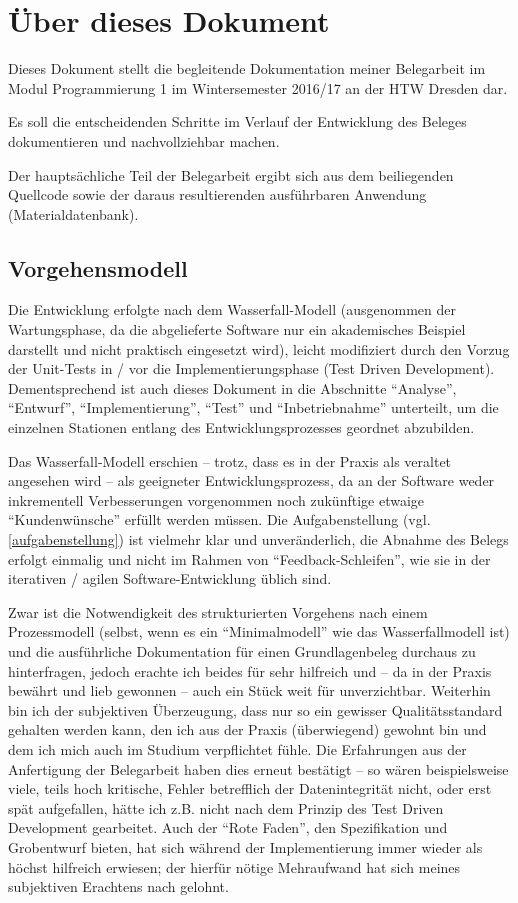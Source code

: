 \section{Über dieses Dokument}

Dieses Dokument stellt die begleitende Dokumentation meiner Belegarbeit im Modul Programmierung 1
im Wintersemester 2016/17 an der HTW Dresden dar.

Es soll die entscheidenden Schritte im Verlauf der Entwicklung des Beleges dokumentieren und
nachvollziehbar machen.

Der hauptsächliche Teil der Belegarbeit ergibt sich aus dem beiliegenden Quellcode sowie der daraus resultierenden
ausführbaren Anwendung (Materialdatenbank).

\subsection{Vorgehensmodell}
Die Entwicklung erfolgte nach dem Wasserfall-Modell (ausgenommen der Wartungsphase, da die abgelieferte Software
nur ein akademisches Beispiel darstellt und nicht praktisch eingesetzt wird), leicht modifiziert durch den Vorzug der
Unit-Tests in / vor die Implementierungsphase (Test Driven Development). Dementsprechend ist auch dieses Dokument
in die Abschnitte ``Analyse'', ``Entwurf'', ``Implementierung'', ``Test'' und ``Inbetriebnahme''
unterteilt, um die einzelnen Stationen entlang des Entwicklungsprozesses geordnet abzubilden.

Das Wasserfall-Modell erschien -- trotz, dass es in der Praxis als veraltet angesehen wird -- als geeigneter
Entwicklungsprozess, da an der Software weder inkrementell Verbesserungen vorgenommen noch zukünftige etwaige
``Kundenwünsche'' erfüllt werden müssen. Die Aufgabenstellung (vgl. \ref{aufgabenstellung}) ist vielmehr klar und
unveränderlich, die Abnahme des Belegs erfolgt einmalig und nicht im Rahmen von ``Feedback-Schleifen'', wie sie in
der iterativen / agilen Software-Entwicklung üblich sind.

Zwar ist die Notwendigkeit des strukturierten Vorgehens nach einem Prozessmodell (selbst, wenn es ein ``Minimalmodell''
wie das Wasserfallmodell ist) und die ausführliche Dokumentation für einen Grundlagenbeleg durchaus zu hinterfragen,
jedoch erachte ich beides für sehr hilfreich und -- da in der Praxis bewährt und lieb gewonnen -- auch ein Stück weit für
unverzichtbar. Weiterhin bin ich der subjektiven Überzeugung, dass nur so ein gewisser Qualitätsstandard gehalten werden
kann, den ich aus der Praxis (überwiegend) gewohnt bin und dem ich mich auch im Studium verpflichtet fühle.
Die Erfahrungen aus der Anfertigung der Belegarbeit haben dies erneut bestätigt -- so wären beispielsweise viele, teils
hoch kritische, Fehler betrefflich der Datenintegrität nicht, oder erst spät aufgefallen, hätte ich z.B. nicht nach dem
Prinzip des Test Driven Development gearbeitet. Auch der ``Rote Faden'', den Spezifikation und Grobentwurf bieten,
hat sich während der Implementierung immer wieder als höchst hilfreich erwiesen; der hierfür nötige Mehraufwand hat sich
meines subjektiven Erachtens nach gelohnt.
